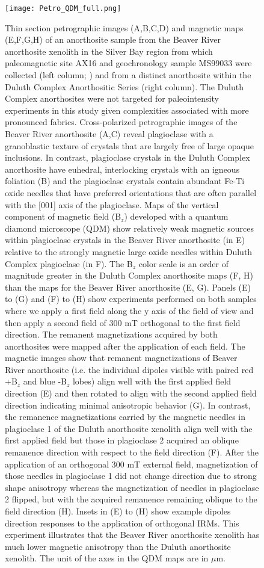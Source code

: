 \documentclass[9pt,twocolumn,twoside,lineno]{pnas-new}
\begin{document}
\begin{figure}
\centering
\noindent\texttt{[image: Petro\_QDM\_full.png]}
\caption{\footnotesize{Thin section petrographic images (A,B,C,D) and magnetic maps (E,F,G,H) of an anorthosite sample from the Beaver River anorthosite xenolith in the Silver Bay region from which paleomagnetic site AX16 and geochronology sample MS99033 were collected (left column;  \citealp{Zhang2021b}) and from a distinct anorthosite within the Duluth Complex Anorthositic Series (right column). The Duluth Complex anorthosites were not targeted for paleointensity experiments in this study given complexities associated with more pronounced fabrics. Cross-polarized petrographic images of the Beaver River anorthosite (A,C) reveal plagioclase with a granoblastic texture of crystals that are largely free of large opaque inclusions. In contrast, plagioclase crystals in the Duluth Complex anorthosite have euhedral, interlocking crystals with an igneous foliation (B) and the plagioclase crystals contain abundant Fe-Ti oxide needles that have preferred orientations that are often parallel with the [001] axis of the plagioclase. Maps of the vertical component of magnetic field (B$_z$) developed with a quantum diamond microscope (QDM) show relatively weak magnetic sources within plagioclase crystals in the Beaver River anorthosite (in E) relative to the strongly magnetic large oxide needles within Duluth Complex plagioclase (in F). The B$_z$ color scale is an order of magnitude greater in the Duluth Complex anorthosite maps (F, H) than the maps for the Beaver River anorthosite (E, G). Panels (E) to (G) and (F) to (H) show experiments performed on both samples where we apply a first field along the y axis of the field of view and then apply a second field of 300 mT orthogonal to the first field direction. The remanent magnetizations acquired by both anorthosites were mapped after the application of each field. The magnetic images show that remanent magnetizations of Beaver River anorthosite (i.e. the individual dipoles visible with paired red +B$_z$ and blue -B$_z$ lobes) align well with the first applied field direction (E) and then rotated to align with the second applied field direction indicating minimal anisotropic behavior (G). In contrast, the remanence magnetizations carried by the magnetic needles in plagioclase 1 of the Duluth anorthosite xenolith align well with the first applied field but those in plagioclase 2 acquired an oblique remanence direction with respect to the field direction (F). After the application of an orthogonal 300 mT external field, magnetization of those needles in plagioclase 1 did not change direction due to strong shape anisotropy whereas the magnetization of needles in plagioclase 2 flipped, but with the acquired remanence remaining oblique to the field direction (H). Insets in (E) to (H) show example dipoles direction responses to the application of orthogonal IRMs. This experiment illustrates that the Beaver River anorthosite xenolith has much lower magnetic anisotropy than the Duluth anorthosite xenolith. The unit of the axes in the QDM maps are in $\mu$m.}}
\label{fig:Petro_QDM}
\end{figure}
\end{document}
